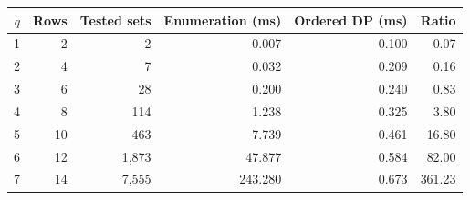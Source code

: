 \begin{tabular}{rrrrrr}
\toprule
$q$ & Rows & Tested sets & Enumeration (ms) & Ordered DP (ms) & Ratio \\
\midrule
1 & 2 & 2 & 0.007 & 0.100 & 0.07 \\
2 & 4 & 7 & 0.032 & 0.209 & 0.16 \\
3 & 6 & 28 & 0.200 & 0.240 & 0.83 \\
4 & 8 & 114 & 1.238 & 0.325 & 3.80 \\
5 & 10 & 463 & 7.739 & 0.461 & 16.80 \\
6 & 12 & 1,873 & 47.877 & 0.584 & 82.00 \\
7 & 14 & 7,555 & 243.280 & 0.673 & 361.23 \\
\bottomrule
\end{tabular}
